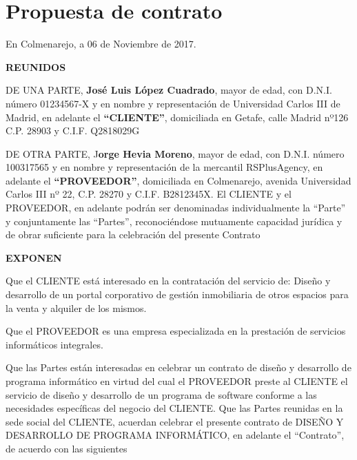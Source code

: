 \chapter{Propuesta de contrato}

En Colmenarejo, a 06 de Noviembre de 2017.
\begin{center}
  \textbf{REUNIDOS}
\end{center}

\par DE UNA  PARTE, \textbf{José Luis López Cuadrado}, mayor de edad, con D.N.I. número 01234567-X y en nombre y representación de Universidad Carlos III de Madrid, en adelante el \textbf{“CLIENTE”}, domiciliada en Getafe, calle Madrid nº126 C.P. 28903  y C.I.F. Q2818029G
\par DE OTRA  PARTE, J\textbf{orge Hevia Moreno}, mayor de edad, con D.N.I. número 100317565 y en nombre y representación de la mercantil RSPlusAgency, en adelante el \textbf{“PROVEEDOR”}, domiciliada en Colmenarejo, avenida Universidad Carlos III nº 22, C.P. 28270  y C.I.F. B2812345X.
El CLIENTE y el PROVEEDOR, en adelante podrán ser denominadas individualmente la “Parte” y conjuntamente las “Partes”, reconociéndose mutuamente capacidad jurídica y de obrar suficiente para la celebración del presente Contrato

\begin{center}
  \textbf{EXPONEN}
\end{center}

\begin{description} [style=multiline, leftmargin=3cm]
  \item[PRIMERO:] Que el CLIENTE está interesado en la contratación del servicio de:
  Diseño y desarrollo de un portal corporativo de gestión inmobiliaria de otros espacios para la venta y alquiler de los mismos.
  \item[SEGUNDO:] Que el PROVEEDOR es una empresa especializada en la prestación de servicios informáticos integrales.
  \item[TERCERO:] Que las Partes están interesadas en celebrar un contrato de diseño y desarrollo de programa informático en virtud del cual el PROVEEDOR preste al CLIENTE el servicio de diseño y desarrollo de un programa de software conforme a las necesidades específicas del negocio del CLIENTE.
  Que las Partes reunidas en la sede social del CLIENTE, acuerdan celebrar el presente contrato de DISEÑO Y DESARROLLO DE PROGRAMA INFORMÁTICO, en adelante el “Contrato”, de acuerdo con las siguientes
\end{description}

